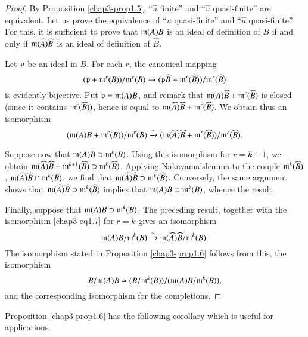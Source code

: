 \begin{proof}
By Proposition \ref{chap3-prop1.5}, ``$\widehat{u}$ finite'' and ``$\widehat{u}$ quasi-finite'' are equivalent. Let us prove the equivalence of ``$u$ quasi-finite'' and ``$\widehat{u}$ quasi-finite''. For this, it is sufficient to prove that $\mathfrak{m}(A)B$ is an ideal of definition of $B$ if and only if $\mathfrak{m}(\widehat{A})\widehat{B}$ is an ideal of definition of $\widehat{B}$.

Let $\mathfrak{p}$ be an ideal in $B$. For each $r$, the canonical mapping
$$
(\mathfrak{p}+\mathfrak{m}^{r}(B))/\mathfrak{m}^{r}(B)\to (\mathfrak{p}\widehat{B}+\mathfrak{m}^{r}(\widehat{B}))/\mathfrak{m}^{r}(\widehat{B})
$$
is evidently bijective. Put $\mathfrak{p}=\mathfrak{m}(A)B$, and remark that $\mathfrak{m}(A)\widehat{B}+\mathfrak{m}^{r}(\widehat{B})$ is closed (since it contains $\mathfrak{m}^{r}(\widehat{B}))$, hence is equal to $\mathfrak{m}(\widehat{A})\widehat{B}+\mathfrak{m}^{r}(\widehat{B})$. We obtain thus an isomorphism
\setcounter{equation}{6}
\begin{equation}
(\mathfrak{m}(A)B+\mathfrak{m}^{r}(B))/\mathfrak{m}^{r}(B)\xrightarrow{\sim}(\mathfrak{m}(\widehat{A})\widehat{B}+\mathfrak{m}^{r}(\widehat{B}))/\mathfrak{m}^{r}(\widehat{B}).\label{chap3-eq1.7}
\end{equation}

Suppose now that $\mathfrak{m}(A)B\supset \mathfrak{m}^{k}(B)$. Using this isomorphism for $r=k+1$, we obtain $\mathfrak{m}(\widehat{A})\widehat{B}+\mathfrak{m}^{k+1}(\widehat{B})\supset \mathfrak{m}^{k}(\widehat{B})$. Applying Nakayama's\pageoriginale lemma to the couple $\mathfrak{m}^{k}(\widehat{B})$, $\mathfrak{m}(\widehat{A})\widehat{B}\cap \mathfrak{m}^{k}(B)$, we find that $\mathfrak{m}(\widehat{A})\widehat{B}\supset \mathfrak{m}^{k}(\widehat{B})$. Conversely, the same argument shows that $\mathfrak{m}(\widehat{A})\widehat{B}\supset \mathfrak{m}^{k}(\widehat{B})$ implies that $\mathfrak{m}(A)B\supset \mathfrak{m}^{k}(B)$, whence the result.

Finally, suppose that $\mathfrak{m}(A)B\supset \mathfrak{m}^{k}(B)$. The preceding result, together with the isomorphism \eqref{chap3-eq1.7} for $r=k$ gives an isomorphism
$$
\mathfrak{m}(A)B/\mathfrak{m}^{k}(B)\xrightarrow{\sim}\mathfrak{m}(\widehat{A})\widehat{B}/\mathfrak{m}^{k}(B).
$$
The isomorphism stated in Proposition \ref{chap3-prop1.6} follows from this, the isomorphism
$$
B/\mathfrak{m}(A)B\simeq (B/\mathfrak{m}^{k}(B))/(\mathfrak{m}(A)B/\mathfrak{m}^{k}(B)),
$$
and the corresponding isomorphism for the completions.
\end{proof}

Proposition \ref{chap3-prop1.6} has the following corollary which is useful for applications.

